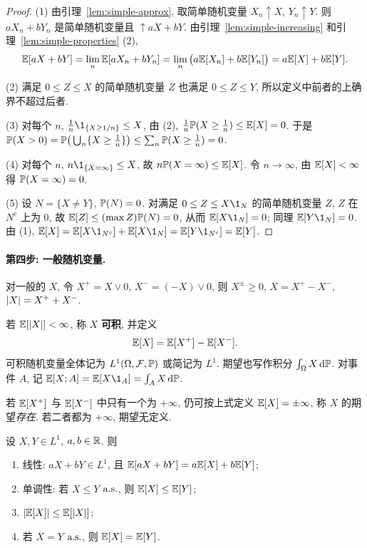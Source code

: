 \begin{proof}
(1) 由引理~\ref{lem:simple-approx}, 取简单随机变量 $X_n\uparrow X$, $Y_n\uparrow Y$. 则 $aX_n+bY_n$ 是简单随机变量且 $\uparrow aX+bY$. 由引理~\ref{lem:simple-increasing} 和引理~\ref{lem:simple-properties} (2),
\[
\E[aX+bY]=\lim_n\E[aX_n+bY_n]=\lim_n\big(a\E[X_n]+b\E[Y_n]\big)=a\E[X]+b\E[Y].
\]

(2) 满足 $0\le Z\le X$ 的简单随机变量 $Z$ 也满足 $0\le Z\le Y$, 所以定义中前者的上确界不超过后者.

(3) 对每个 $n$, $\frac{1}{n}\1_{\{X\ge1/n\}}\le X$, 由 (2), $\frac{1}{n}\P(X\ge\frac{1}{n})\le\E[X]=0$. 于是 $\P(X>0)=\P\big(\bigcup_n\{X\ge\frac{1}{n}\}\big)\le\sum_n\P(X\ge\frac{1}{n})=0$.

(4) 对每个 $n$, $n\1_{\{X=\infty\}}\le X$, 故 $n\P(X=\infty)\le\E[X]$. 令 $n\to\infty$, 由 $\E[X]<\infty$ 得 $\P(X=\infty)=0$.

(5) 设 $N=\{X\ne Y\}$, $\P(N)=0$. 对满足 $0\le Z\le X\1_N$ 的简单随机变量 $Z$, $Z$ 在 $N^c$ 上为 $0$, 故 $\E[Z]\le(\max Z)\P(N)=0$, 从而 $\E[X\1_N]=0$; 同理 $\E[Y\1_N]=0$. 由 (1),
$\E[X]=\E[X\1_{N^c}]+\E[X\1_N]=\E[Y\1_{N^c}]=\E[Y]$.
\end{proof}

\paragraph{第四步: 一般随机变量.}
对一般的 $X$, 令 $X^+=X\vee0$, $X^-=(-X)\vee0$, 则 $X^\pm\ge0$, $X=X^+-X^-$, $\abs{X}=X^++X^-$.

\begin{definition}[期望]\label{def:expectation}
若 $\E[\abs{X}]<\infty$, 称 $X$ \textbf{可积}, 并定义
\[
\E[X]=\E[X^+]-\E[X^-].
\]
可积随机变量全体记为 $L^1(\Omega,\mathcal{F},\P)$ 或简记为 $L^1$. 期望也写作积分 $\int_\Omega X\dd\P$. 对事件 $A$, 记 $\E[X;A]=\E[X\1_A]=\int_A X\dd\P$.
\end{definition}

\begin{remark}
若 $\E[X^+]$ 与 $\E[X^-]$ 中只有一个为 $+\infty$, 仍可按上式定义 $\E[X]=\pm\infty$, 称 $X$ 的期望\emph{存在}. 若二者都为 $+\infty$, 期望无定义.
\end{remark}

\begin{theorem}[期望的基本性质]\label{thm:expectation-properties}
设 $X,Y\in L^1$, $a,b\in\R$. 则
\begin{enumerate}
\item 线性: $aX+bY\in L^1$, 且 $\E[aX+bY]=a\E[X]+b\E[Y]$;
\item 单调性: 若 $X\le Y$ $\as$, 则 $\E[X]\le\E[Y]$;
\item $\abs{\E[X]}\le\E[\abs{X}]$;
\item 若 $X=Y$ $\as$, 则 $\E[X]=\E[Y]$.
\end{enumerate}
\end{theorem}


